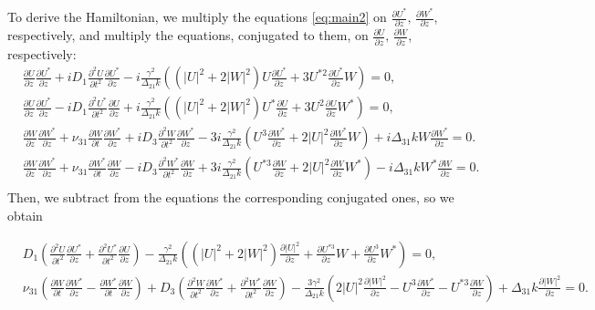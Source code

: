 \documentclass[a4paper, 12pt, onecolumn]{extarticle}
\begin{document}
To derive the Hamiltonian, we multiply the equations \eqref{eq:main2} on \(\frac{\partial U^*}{\partial z},\,\frac{\partial W^*}{\partial z}\), respectively, and multiply the equations, conjugated to them, on \(\frac{\partial U}{\partial z},\,\frac{\partial W}{\partial z}\), respectively:
\[
\begin{aligned}
&\frac{\partial U}{\partial z}\frac{\partial U^*}{\partial z}+iD_1\frac{\partial^2 U}{\partial t^2}\frac{\partial U^*}{\partial z}-i\frac{\gamma^2}{\Delta_{21} k}((|U|^2+2|W|^2)U\frac{\partial U^*}{\partial z}+3U^{*2}\frac{\partial U^*}{\partial z}W)=0,\\
&\frac{\partial U}{\partial z}\frac{\partial U^*}{\partial z}-iD_1\frac{\partial^2 U^*}{\partial t^2}\frac{\partial U}{\partial z}+i\frac{\gamma^2}{\Delta_{21} k}((|U|^2+2|W|^2)U^*\frac{\partial U}{\partial z}+3U^{2}\frac{\partial U}{\partial z}W^*)=0,\\
&\frac{\partial W}{\partial z}\frac{\partial W^*}{\partial z}+\nu_{31}\frac{\partial W}{\partial t}\frac{\partial W^*}{\partial z}+iD_3\frac{\partial^2 W}{\partial t^2}\frac{\partial W^*}{\partial z}-3i\frac{\gamma^2}{\Delta_{21} k}(U^3\frac{\partial W^*}{\partial z}+2|U|^2\frac{\partial W^*}{\partial z}W)+i\Delta_{31}kW\frac{\partial W^*}{\partial z}=0.\\
&\frac{\partial W}{\partial z}\frac{\partial W^*}{\partial z}+\nu_{31}\frac{\partial W^*}{\partial t}\frac{\partial W}{\partial z}-iD_3\frac{\partial^2 W^*}{\partial t^2}\frac{\partial W}{\partial z}+3i\frac{\gamma^2}{\Delta_{21} k}(U^{*3}\frac{\partial W}{\partial z}+2|U|^2\frac{\partial W}{\partial z}W^*)-i\Delta_{31}kW^*\frac{\partial W}{\partial z}=0.\\
\end{aligned}
\]
Then, we subtract from the equations the corresponding conjugated ones, so we obtain
\begin{footnotesize}
\[
\begin{aligned}
&D_1\left(\frac{\partial^2 U}{\partial t^2}\frac{\partial U^*}{\partial z}+\frac{\partial^2 U^*}{\partial t^2}\frac{\partial U}{\partial z}\right)-\frac{\gamma^2}{\Delta_{21}k}\left((|U|^2+2|W|^2)\frac{\partial|U|^2}{\partial z}+\frac{\partial U^{*3}}{\partial z}W+\frac{\partial U^{3}}{\partial z}W^*\right)=0,\\
&\nu_{31}\left(\frac{\partial W}{\partial t}\frac{\partial W^*}{\partial z}-\frac{\partial W^*}{\partial t}\frac{\partial W}{\partial z}\right)+D_3\left(\frac{\partial^2 W}{\partial t^2}\frac{\partial W^*}{\partial z}+\frac{\partial^2 W^*}{\partial t^2}\frac{\partial W}{\partial z}\right)-\frac{3\gamma^2}{\Delta_{21}k}\left(2|U|^2\frac{\partial |W|^2}{\partial z}-U^3\frac{\partial W^*}{\partial z}-U^{*3}\frac{\partial W}{\partial z}\right)+\Delta_{31}k\frac{\partial|W|^2}{\partial z}=0.\\
\end{aligned}
\]
\end{footnotesize}
\end{document}
